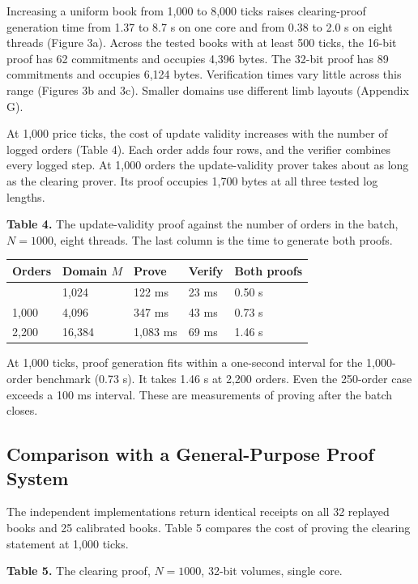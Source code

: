 Increasing a uniform book from 1,000 to 8,000 ticks raises clearing-proof generation time from 1.37 to 8.7 s on one core and from 0.38 to 2.0 s on eight threads (Figure 3a). Across the tested books with at least 500 ticks, the 16-bit proof has 62 commitments and occupies 4,396 bytes. The 32-bit proof has 89 commitments and occupies 6,124 bytes. Verification times vary little across this range (Figures 3b and 3c). Smaller domains use different limb layouts (Appendix G).

At 1,000 price ticks, the cost of update validity increases with the number of logged orders (Table 4). Each order adds four rows, and the verifier combines every logged step. At 1,000 orders the update-validity prover takes about as long as the clearing prover. Its proof occupies 1,700 bytes at all three tested log lengths.

\textbf{Table 4.} The update-validity proof against the number of orders in the batch, \(N = 1000\), eight threads. The last column is the time to generate both proofs.

\begin{longtable}[]{@{}lllll@{}}
\toprule\noalign{}
Orders & Domain \(M\) & Prove & Verify & Both proofs \\
\midrule\noalign{}
\endhead
\bottomrule\noalign{}
\endlastfoot
250 & 1,024 & 122 ms & 23 ms & 0.50 s \\
1,000 & 4,096 & 347 ms & 43 ms & 0.73 s \\
2,200 & 16,384 & 1,083 ms & 69 ms & 1.46 s \\
\end{longtable}

At 1,000 ticks, proof generation fits within a one-second interval for the 1,000-order benchmark (0.73 s). It takes 1.46 s at 2,200 orders. Even the 250-order case exceeds a 100 ms interval. These are measurements of proving after the batch closes.

\subsection{Comparison with a General-Purpose Proof System}

The independent implementations return identical receipts on all 32 replayed books and 25 calibrated books. Table 5 compares the cost of proving the clearing statement at 1,000 ticks.

\textbf{Table 5.} The clearing proof, \(N = 1000\), 32-bit volumes, single core.

